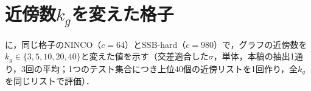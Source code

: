 \begin{table}[htbp]
\centering
\caption{再出現と混入率の格子：NINCO，$\sR$（\FPR{}[\%]）．}
\label{tab:recrefninco}
\vspace{1.5mm}

\end{table}

\begin{table}[htbp]
\centering
\caption{再出現と混入率の格子：SSB-hard，$\sR$（\FPR{}[\%]）．}
\label{tab:recrefssb}
\vspace{1.5mm}

\end{table}

\begin{table}[htbp]
\centering
\caption{再出現と混入率の格子：NINCO，交差適合した$\sigma$（[\%]）．}
\label{tab:recninco}
\vspace{1.5mm}

\end{table}

\begin{table}[htbp]
\centering
\caption{再出現と混入率の格子：SSB-hard，交差適合した$\sigma$（[\%]）．}
\label{tab:recssb}
\vspace{1.5mm}

\end{table}

\section{近傍数$k_g$を変えた格子}
\label{sec:app_kg}
に，同じ格子のNINCO（$c{=}64$）とSSB-hard（$c{=}980$）で，グラフの近傍数を$k_g\in\{3,5,10,20,40\}$と変えた値を示す（交差適合した$\sigma$，単体，本稿の抽出1通り，3回の平均；1つのテスト集合につき上位40個の近傍リストを1回作り，全$k_g$を同じリストで評価）．




